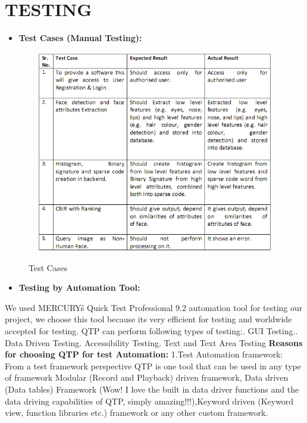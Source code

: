\chapter{TESTING}
\begin{itemize}
\item \textbf {Test Cases (Manual Testing):}
\end{itemize}

\begin{figure}[ht!]
	\centering
\includegraphics[height=250pt,width=450pt]{test.png}\\
\caption{Test Cases}
\end{figure}
\begin{itemize}
\item \textbf {Testing by Automation Tool:}
\end{itemize}
 We used MERCURY\'s Quick Test Professional 9.2 automation tool for testing our project, we choose this tool because it\’s very efficient for testing and worldwide accepted for testing. QTP can perform following types of testing:\newline\newline\newline{}.	GUI Testing..	Data Driven Testing.	Accessibility Testing.	Text and Text Area Testing\newline
\textbf{Reasons for choosing QTP for test Automation:}\newline
1.Test Automation framework: From a test framework perspective QTP is one tool that can be used in any type of framework Modular (Record and Playback) driven framework, Data driven (Data tables) Framework (Wow! I love the built in data driver functions and the data driving capabilities of QTP, simply amazing!!!),Keyword driven (Keyword view, function libraries etc.) framework or any other custom framework.\newline
